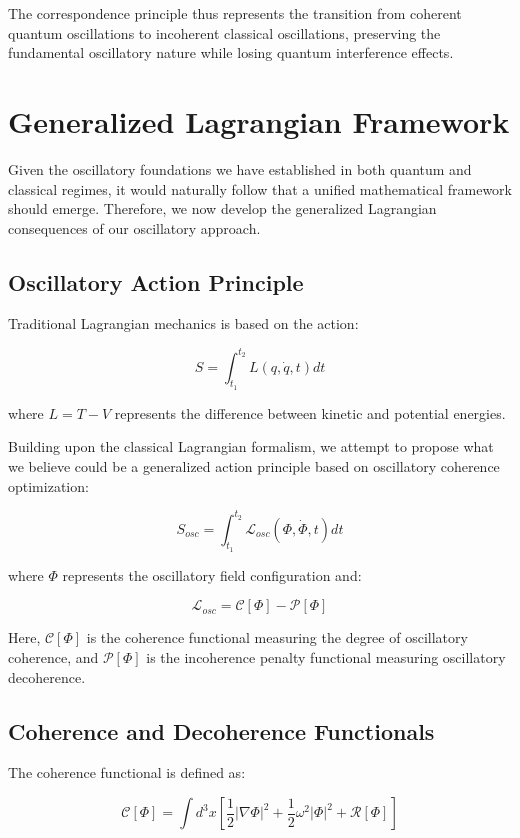 \documentclass[11pt]{article}
\theoremstyle{remark}
\begin{document}
The correspondence principle thus represents the transition from coherent quantum oscillations to incoherent classical oscillations, preserving the fundamental oscillatory nature while losing quantum interference effects.

\section{Generalized Lagrangian Framework}

Given the oscillatory foundations we have established in both quantum and classical regimes, it would naturally follow that a unified mathematical framework should emerge. Therefore, we now develop the generalized Lagrangian consequences of our oscillatory approach.

\subsection{Oscillatory Action Principle}

Traditional Lagrangian mechanics \cite{goldstein2002classical,landau1976mechanics} is based on the action:

$$S = \int_{t_1}^{t_2} L(q, \dot{q}, t) dt$$

where $L = T - V$ represents the difference between kinetic and potential energies.

Building upon the classical Lagrangian formalism, we attempt to propose what we believe could be a generalized action principle based on oscillatory coherence optimization:

$$S_{osc} = \int_{t_1}^{t_2} \mathcal{L}_{osc}(\Phi, \dot{\Phi}, t) dt$$

where $\Phi$ represents the oscillatory field configuration and:

$$\mathcal{L}_{osc} = \mathcal{C}[\Phi] - \mathcal{P}[\Phi]$$

Here, $\mathcal{C}[\Phi]$ is the coherence functional measuring the degree of oscillatory coherence, and $\mathcal{P}[\Phi]$ is the incoherence penalty functional measuring oscillatory decoherence.

\subsection{Coherence and Decoherence Functionals}

The coherence functional is defined as:

$$\mathcal{C}[\Phi] = \int d^3x \left[\frac{1}{2}|\nabla\Phi|^2 + \frac{1}{2}\omega^2|\Phi|^2 + \mathcal{R}[\Phi]\right]$$
\end{document}
